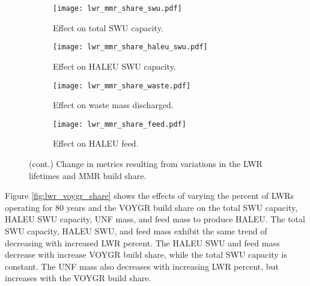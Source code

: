 \begin{figure}
    \ContinuedFloat    
    \begin{subfigure}[h!]{0.48\textwidth}
        \centering
        \texttt{[image: lwr\_mmr\_share\_swu.pdf]}
        \caption{Effect on total SWU capacity.}
        \label{fig:lwr_mmr_share_swu}
    \end{subfigure}
    \hfill
    \begin{subfigure}[h!]{0.48\textwidth}
        \centering
        \texttt{[image: lwr\_mmr\_share\_haleu\_swu.pdf]}
        \caption{Effect on HALEU SWU capacity.}
        \label{fig:lwr_mmr_share_haleu_swu}
    \end{subfigure}

    \begin{subfigure}[h!]{0.48\textwidth}
        \centering
        \texttt{[image: lwr\_mmr\_share\_waste.pdf]}
        \caption{Effect on waste mass discharged.}
        \label{fig:lwr_mmr_share_waste}
    \end{subfigure}
    \hfill
    \begin{subfigure}[h!]{0.48\textwidth}
        \centering
        \texttt{[image: lwr\_mmr\_share\_feed.pdf]}
        \caption{Effect on HALEU feed.}
        \label{fig:lwr_mmr_share_feed}
    \end{subfigure}
    \caption{(cont.) Change in metrics resulting from variations in the 
    LWR lifetimes and MMR build share.}
    \label{fig:lwr_mmr_share}
\end{figure}

Figure \ref{fig:lwr_voygr_share} shows the effects of varying the 
percent of \glspl{LWR} operating for 80 years and the VOYGR build share
on the total \gls{SWU} capacity, \gls{HALEU} \gls{SWU} capacity, 
\gls{UNF} mass, and feed mass to produce \gls{HALEU}. The total 
\gls{SWU} capacity, \gls{HALEU} \gls{SWU}, and feed mass exhibit the same 
trend of decreasing with increased \gls{LWR} percent. The \gls{HALEU} 
\gls{SWU} and feed mass decrease with increase VOYGR build share, 
while the total \gls{SWU} capacity is constant. The \gls{UNF} mass 
also decreases with increasing \gls{LWR} percent, but increases with 
the VOYGR build share. 


